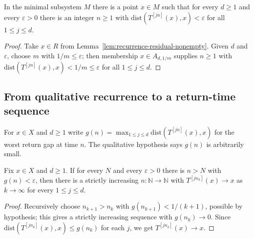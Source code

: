 \begin{lemma}
    \label{lem:residual-recurrent}
    \leanok
    In the minimal subsystem $M$ there is a point $x \in M$ such that for every
    $d \ge 1$ and every $\varepsilon > 0$ there is an integer $n \ge 1$ with
    $\mathrm{dist}(T^{[j n]}(x), x) < \varepsilon$ for all $1 \le j \le d$.
\end{lemma}
\begin{proof}
    Take $x \in R$ from Lemma~\ref{lem:recurrence-residual-nonempty}. Given $d$
    and $\varepsilon$, choose $m$ with $1/m \le \varepsilon$; then membership
    $x \in A_{d, 1/m}$ supplies $n \ge 1$ with
    $\mathrm{dist}(T^{[j n]}(x), x) < 1/m \le \varepsilon$ for all
    $1 \le j \le d$.
\end{proof}

\subsection{From qualitative recurrence to a return-time sequence}

For $x \in X$ and $d \ge 1$ write
$g(n) = \max_{1 \le j \le d} \mathrm{dist}(T^{[j n]}(x), x)$ for the worst return
gap at time $n$. The qualitative hypothesis says $g(n)$ is arbitrarily small.

\begin{lemma}
    \label{lem:recurrence-subseq}
    \leanok
    Fix $x \in X$ and $d \ge 1$. If for every $N$ and every $\varepsilon > 0$
    there is $n > N$ with $g(n) < \varepsilon$, then there is a strictly
    increasing $n : \mathbb{N} \to \mathbb{N}$ with $T^{[j n_k]}(x) \to x$ as
    $k \to \infty$ for every $1 \le j \le d$.
\end{lemma}
\begin{proof}
    Recursively choose $n_{k+1} > n_k$ with $g(n_{k+1}) < 1/(k+1)$, possible by
    hypothesis; this gives a strictly increasing sequence with $g(n_k) \to 0$.
    Since $\mathrm{dist}(T^{[j n_k]}(x), x) \le g(n_k)$ for each $j$, we get
    $T^{[j n_k]}(x) \to x$.
\end{proof}

